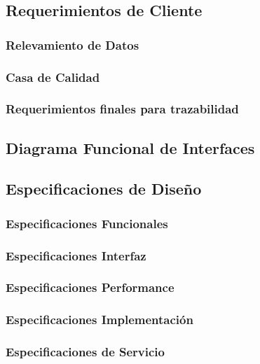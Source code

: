%

%

\subsection{Requerimientos de Cliente}


\subsubsection{Relevamiento de Datos}


\subsubsection{Casa de Calidad}


\subsubsection{Requerimientos finales para trazabilidad}

\subsection{Diagrama Funcional de Interfaces}

 
\subsection{Especificaciones de Diseño}

\subsubsection{Especificaciones Funcionales}
\subsubsection{Especificaciones Interfaz}
\subsubsection{Especificaciones Performance}
\subsubsection{Especificaciones Implementación}
\subsubsection{Especificaciones de Servicio}


%